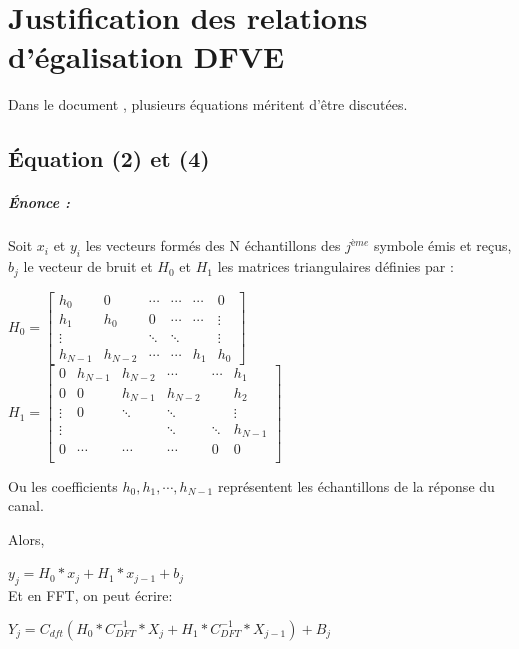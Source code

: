 
\chapter{Justification des relations d'égalisation DFVE}

Dans le document \cite{sujet}, plusieurs équations méritent d'être discutées.

\section{Équation (2) et (4)}
\label{sec:24}

\paragraph{Énonce :}

Soit $x_i$ et $y_i$ les vecteurs formés des N échantillons des $j^{ème}$
symbole émis et reçus, $b_j$ le vecteur de bruit et $H_0$ et $H_1$ les matrices
triangulaires définies par :

$H_0=
\begin{bmatrix}
  h_0 & 0 & \cdots & \cdots & \cdots & 0 \\
  h_1 & h_0 & 0 & \cdots  & \cdots & \vdots \\
  \vdots & & \ddots & \ddots &  & \vdots \\
  h_{N-1} & h_{N-2} & \cdots & \cdots & h_1 & h_0

\end{bmatrix}
$  $H_1=
\begin{bmatrix}
  0 & h_{N-1} & h_{N-2} & \cdots & \cdots & h_1 \\
  0 & 0 & h_{N-1} & h_{N-2} &  & h_2 \\
  \vdots & 0 & \ddots & \ddots &   & \vdots \\
  \vdots &  &  & \ddots  & \ddots & h_{N-1} \\
  0 & \cdots & \cdots & \cdots & 0 & 0 \\


\end{bmatrix}
$

Ou les coefficients $h_0,h_1,\cdots,h_{N-1}$ représentent les échantillons de la
réponse du canal.

Alors,

$ y_j = H_0*x_j+H_1*x_{j-1}+b_j$
~\\

Et en FFT, on peut écrire:

$ Y_j = C_{dft}(H_0*C_{DFT}^{-1}*X_j + H_1*C_{DFT}^{-1}*X_{j-1}) + B_j$

